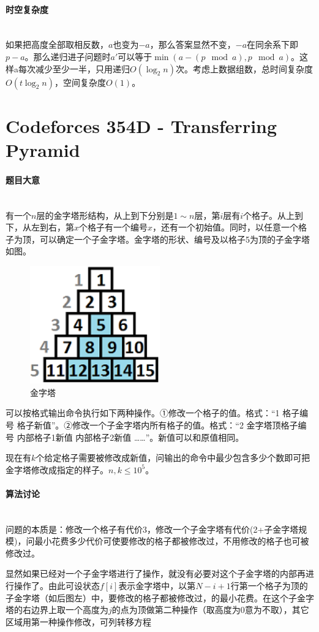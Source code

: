 \documentclass[UTF8]{ctexart}
\newcommand{\myparagraph}[1]{\paragraph{#1}\mbox{}\\}
\theoremstyle{nonumberplain}
\begin{document}
		\myparagraph{时空复杂度}
		
			如果把高度全部取相反数，$a$也变为$-a$，那么答案显然不变，$-a$在同余系下即$p-a$。那么递归进子问题时$a'$可以等于$\min(a-(p \mod a), p \mod a)$。这样a每次减少至少一半，只用递归$O(\log_2n)$次。考虑上数据组数，总时间复杂度$O(t\log_2n)$，空间复杂度$O(1)$。
	
	\section{Codeforces 354D - Transferring Pyramid}
	
		\myparagraph{题目大意}
		
			有一个$n$层的金字塔形结构，从上到下分别是$1 \sim n$层，第$i$层有$i$个格子。从上到下，从左到右，第$x$个格子有一个编号$x$，还有一个初始值。同时，以任意一个格子为顶，可以确定一个子金字塔。金字塔的形状、编号及以格子5为顶的子金字塔如图。
			
			\begin{figure}[ht]
				\centering
				\includegraphics[width=0.5\textwidth]{fig354d_1.png}
				\caption{金字塔}
			\end{figure}
			
			可以按格式输出命令执行如下两种操作。①修改一个格子的值。格式：“1 格子编号 格子新值”。②修改一个子金字塔内所有格子的值。格式：“2 金字塔顶格子编号 内部格子1新值 内部格子2新值 ……”。新值可以和原值相同。
			
			现在有$k$个给定格子需要被修改成新值，问输出的命令中最少包含多少个数即可把金字塔修改成指定的样子。$n,k \leq 10^5$。
		
		\myparagraph{算法讨论}
		
			问题的本质是：修改一个格子有代价3，修改一个子金字塔有代价(2+子金字塔规模)，问最小花费多少代价可使要修改的格子都被修改过，不用修改的格子也可被修改过。
			
			显然如果已经对一个子金字塔进行了操作，就没有必要对这个子金字塔的内部再进行操作了。由此可设状态$f[i]$表示金字塔中，以第$N-i+1$行第一个格子为顶的子金字塔（如后图左）中，要修改的格子都被修改过，的最小花费。在这个子金字塔的右边界上取一个高度为$j$的点为顶做第二种操作（取高度为0意为不取），其它区域用第一种操作修改，可列转移方程
			
\end{document}
